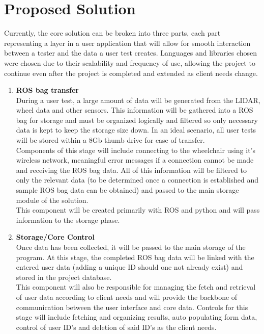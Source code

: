 \documentclass[onecolumn, draftclsnofoot,10pt, compsoc]{IEEEtran}
\begin{document}
\section{Proposed Solution}
Currently, the core solution can be broken into three parts, each part representing a layer in a user application that will allow for smooth interaction between a tester and the data a user test creates. Languages and libraries chosen were chosen due to their scalability and frequency of use, allowing the project to continue even after the project is completed and extended as client needs change.  
\begin{enumerate}
	\item \textbf{ROS bag transfer}\\
	During a user test, a large amount of data will be generated from the LIDAR, wheel data and other sensors. This information will be gathered into a ROS bag for storage and must be organized logically and filtered so only necessary data is kept to keep the storage size down. In an ideal scenario, all user tests will be stored within a 8Gb thumb drive for ease of transfer.\\
	Components of this stage will include connecting to the wheelchair using it's wireless network, meaningful error messages if a connection cannot be made and receiving the ROS bag data. All of this information will be filtered to only the relevant data (to be determined once a connection is established and sample ROS bag data can be obtained) and passed to the main storage module of the solution.\\ 
	This component will be created primarily with ROS and python and will pass information to the storage phase. \\
	\item \textbf{Storage/Core Control}\\
	Once data has been collected, it will be passed to the main storage of the program. At this stage, the completed ROS bag data will be linked with the entered user data (adding a unique ID should one not already exist) and stored in the project database.\\
	This component will also be responsible for managing the fetch and retrieval of user data according to client needs and will provide the backbone of communication between the user interface and core data. Controls for this stage will include fetching and organizing results, auto populating form data, control of user ID's and deletion of said ID's as the client needs. \\

\end{enumerate}
\end{document}
